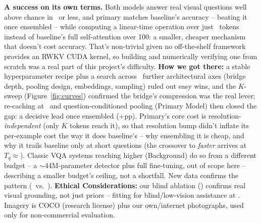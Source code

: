 \documentclass[final]{article}
\begin{document}
\textbf{A success on its own terms.} Both models answer real visual questions well above chance in
\primaryTotalSize\ or less, and primary matches baseline's accuracy -- beating it once ensembled
-- while computing a linear-time operation over just \primaryTunedK\ tokens instead of baseline's
full self-attention over 100: a smaller, cheaper mechanism that doesn't cost accuracy. That's
non-trivial given no off-the-shelf framework provides an RWKV CUDA kernel, so building and
numerically verifying one from scratch was a real part of this project's difficulty. \textbf{How
we got there:} a stable hyperparameter recipe plus a search across \phaseOneAxesTried\ further
architectural axes (bridge depth, pooling design, embeddings, sampling) ruled out easy wins, and
the $K$-sweep (Figure~\ref{fig:curves}) confirmed the bridge's compression was the real lever;
re-caching at \primaryResolution\ and question-conditioned pooling (Primary Model) then closed
the gap: a decisive lead once ensembled (+\ensembleGainOverBaseline pp). Primary's core cost is
resolution-\emph{independent} (only $K$ tokens reach it), so that resolution bump didn't inflate
its per-example cost the way it does baseline's -- why ensembling it is cheap, and why it trails
baseline only at short questions (the crossover to \emph{faster} arrives at
$T_q{\approx}$\crossoverTq). Classic VQA systems reaching higher (Background) do so from a
different budget -- a $\sim$44M-parameter detector plus full fine-tuning, out of scope here --
describing a smaller budget's ceiling, not a shortfall. New data confirms the pattern
(\newDataPrimaryAcc\ vs.\ \newDataBaselineAcc). \textbf{Ethical Considerations:} our blind
ablation (\blindFloor) confirms real visual grounding, not just priors
\cite{agrawal2018dontjust} -- fitting for blind/low-vision assistance at \primaryTotalSize.
Imagery is COCO (research license) plus our own/internet photographs, used only for
non-commercial evaluation.

\newpage


\end{document}
